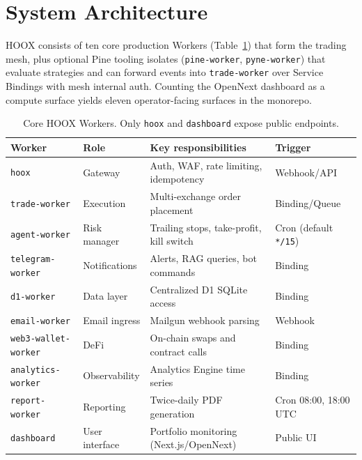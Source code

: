 \section{System Architecture}
\label{sec:architecture}

\textsc{HOOX} consists of ten core production Workers (Table~\ref{tab:workers}) that form the trading mesh, plus optional Pine tooling isolates (\texttt{pine-worker}, \texttt{pyne-worker}) that evaluate strategies and can forward events into \texttt{trade-worker} over Service Bindings with mesh internal auth. Counting the OpenNext dashboard as a compute surface yields eleven operator-facing surfaces in the monorepo.

\begin{table}[t]
  \centering
  \caption{Core \textsc{HOOX} Workers. Only \texttt{hoox} and \texttt{dashboard} expose public endpoints.}
  \label{tab:workers}
  \small
  \begin{tabular*}{\linewidth}{@{\extracolsep{\fill}}llp{5.5cm}l@{}}
    \toprule
    \textbf{Worker} & \textbf{Role} & \textbf{Key responsibilities} & \textbf{Trigger} \\
    \midrule
    \texttt{hoox} & Gateway & Auth, WAF, rate limiting, idempotency & Webhook/API \\
    \texttt{trade-worker} & Execution & Multi-exchange order placement & Binding/Queue \\
    \texttt{agent-worker} & Risk manager & Trailing stops, take-profit, kill switch & Cron (default \texttt{*/15}) \\
    \texttt{telegram-worker} & Notifications & Alerts, RAG queries, bot commands & Binding \\
    \texttt{d1-worker} & Data layer & Centralized D1 SQLite access & Binding \\
    \texttt{email-worker} & Email ingress & Mailgun webhook parsing & Webhook \\
    \texttt{web3-wallet-worker} & DeFi & On-chain swaps and contract calls & Binding \\
    \texttt{analytics-worker} & Observability & Analytics Engine time series & Binding \\
    \texttt{report-worker} & Reporting & Twice-daily PDF generation & Cron 08:00, 18:00 UTC \\
    \texttt{dashboard} & User interface & Portfolio monitoring (Next.js/OpenNext) & Public UI \\
    \bottomrule
  \end{tabular*}
\end{table}

